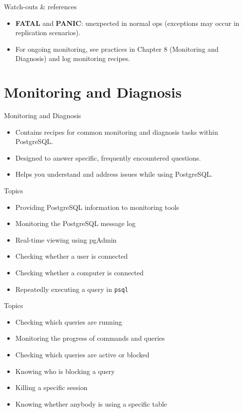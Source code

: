 \documentclass[aspectratio=169]{beamer}
\begin{document}
\begin{frame}{Watch-outs \& references}
  \begin{itemize}
    \item \textbf{FATAL} and \textbf{PANIC}: unexpected in normal ops (exceptions may occur in replication scenarios).
    \item For ongoing monitoring, see practices in Chapter 8 (Monitoring and Diagnosis) and log monitoring recipes.
  \end{itemize}
\end{frame}

\section{Monitoring and Diagnosis}

\begin{frame}{Monitoring and Diagnosis}
\begin{itemize}
    \item Contains recipes for common monitoring and diagnosis tasks within PostgreSQL.
    \item Designed to answer specific, frequently encountered questions.
    \item Helps you understand and address issues while using PostgreSQL.
\end{itemize}
\end{frame}

\begin{frame}{Topics}
    \begin{itemize}
        \item Providing PostgreSQL information to monitoring tools
        \item Monitoring the PostgreSQL message log
        \item Real-time viewing using pgAdmin
        \item Checking whether a user is connected
        \item Checking whether a computer is connected
        \item Repeatedly executing a query in \texttt{psql}
    \end{itemize}
\end{frame}

\begin{frame}{Topics}
    \begin{itemize}
        \item Checking which queries are running
        \item Monitoring the progress of commands and queries
        \item Checking which queries are active or blocked
        \item Knowing who is blocking a query
        \item Killing a specific session
        \item Knowing whether anybody is using a specific table
    \end{itemize}
\end{frame}
\end{document}
